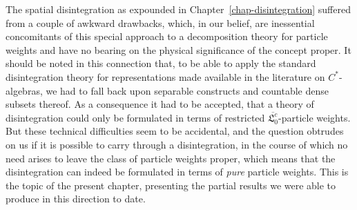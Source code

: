 \documentclass[11pt,twoside,openright]{report}
\theoremstyle{definition}
\theoremstyle{plain}
\theoremstyle{remark}
\theoremstyle{assumption}
\newcommand{\vaccountbar}{\overline{\mathfrak{L}_0^c}}
\begin{document}
The spatial disintegration as expounded in
Chapter~\ref{chap-disintegration} suffered from a couple of awkward
drawbacks, which, in our belief, are inessential concomitants of this
special approach to a decomposition theory for particle weights and
have no bearing on the physical significance of the concept proper. It
should be noted in this connection that, to be able to apply the
standard disintegration theory for representations made available in
the literature on $C^*$-algebras, we had to fall back upon separable
constructs and countable dense subsets thereof. As a consequence it
had to be accepted, that a theory of disintegration could only be
formulated in terms of restricted $\vaccountbar$-particle
weights. But these technical difficulties seem to be accidental, and
the question obtrudes on us if it is possible to carry through a
disintegration, in the course of which no need arises to leave the
class of particle weights proper, which means that the disintegration
can indeed be formulated in terms of \emph{pure} particle
weights. This is the topic of the present chapter, presenting the
partial results we were able to produce in this direction to date.
\end{document}
